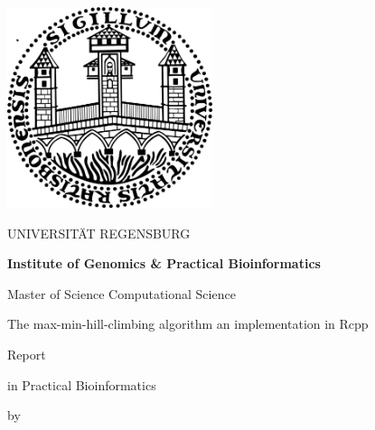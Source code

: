 
\usepackage{geometry}
\geometry{tmargin=2cm,bmargin=3cm,lmargin=2cm,rmargin=2cm}

\usepackage{tikz}
\usetikzlibrary{arrows}


\pagestyle{empty}

\clearscrheadings\clearscrplain

\begin{center}
\includegraphics[width=6cm]{img/uniR.png}

\begin{huge}
UNIVERSITÄT REGENSBURG
\vspace{10mm}
\end{huge}

{\Large \textbf{Institute of Genomics \& Practical Bioinformatics}}
\vspace{0mm}

{\Large Master of Science Computational Science}

\vspace{10mm}
\begin{huge}
The max-min-hill-climbing algorithm an implementation in Rcpp
\end{huge}

\vspace{10mm}

\begin{Large}
Report
\end{Large}

\begin{large}
in Practical Bioinformatics
\end{large}

\vspace{5mm}
\begin{small}
by
\end{small}


\end{center}
